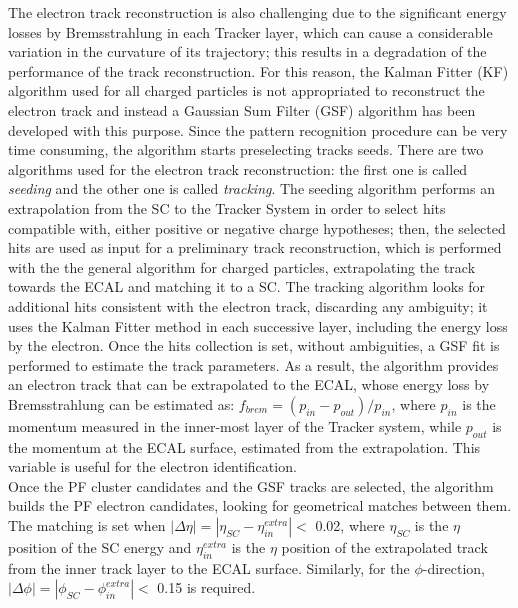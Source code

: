 \noindent The electron track reconstruction is also challenging due to the significant energy losses by 
Bremsstrahlung in each Tracker layer, which can cause a considerable variation in the 
curvature of its trajectory; this results in a degradation of the performance of the track reconstruction.
For this reason, the Kalman Fitter (KF) algorithm used for all charged particles is not appropriated to reconstruct
the electron track and instead a Gaussian Sum Filter (GSF) \cite{ElectronGSF} algorithm has been developed with 
this purpose. Since the pattern recognition procedure can be very time consuming, the algorithm
starts preselecting tracks seeds. There are two algorithms used for the electron track reconstruction:
the first one is called \textit{seeding} and the other one is called \textit{tracking}. The seeding
algorithm performs an extrapolation from the SC to the Tracker System in order to 
select hits compatible with, either positive or negative charge hypotheses; then, the selected hits  are 
used as input for a preliminary track reconstruction, which is performed with the
the general algorithm for charged particles, extrapolating the track towards the ECAL 
and matching it to a SC. The tracking algorithm looks for additional
hits consistent with the electron track, discarding any ambiguity; it uses the Kalman Fitter method 
in each successive layer, including the energy loss by the electron. Once the hits collection is set, 
without ambiguities, a GSF fit is performed to estimate the track parameters. As a result, 
the algorithm provides an electron track that can be extrapolated to the ECAL, whose
energy loss by Bremsstrahlung can be estimated as: $f_{brem} = (p_{in}-p_{out})/p_{in}$, where
$p_{in}$ is the momentum measured in the inner-most layer of the Tracker system, while $p_{out}$
is the momentum at the ECAL surface, estimated from the extrapolation.  This variable is useful
for the electron identification.\\

\noindent Once the PF cluster candidates and the GSF tracks are selected, the algorithm builds 
the PF electron candidates, looking for geometrical matches between them. The matching is set 
when $|\Delta \eta| = | \eta_{SC} -\eta_{in}^{extra} | <$ 0.02, where $\eta_{SC}$ is the
$\eta$ position of the SC energy and $\eta_{in}^{extra}$ is the $\eta$ position of the 
extrapolated track from the inner track layer to the ECAL surface. Similarly, for the $\phi$-direction,
 $|\Delta \phi| = | \phi_{SC} -\phi_{in}^{extra} | <$ 0.15 is required.\\
 
